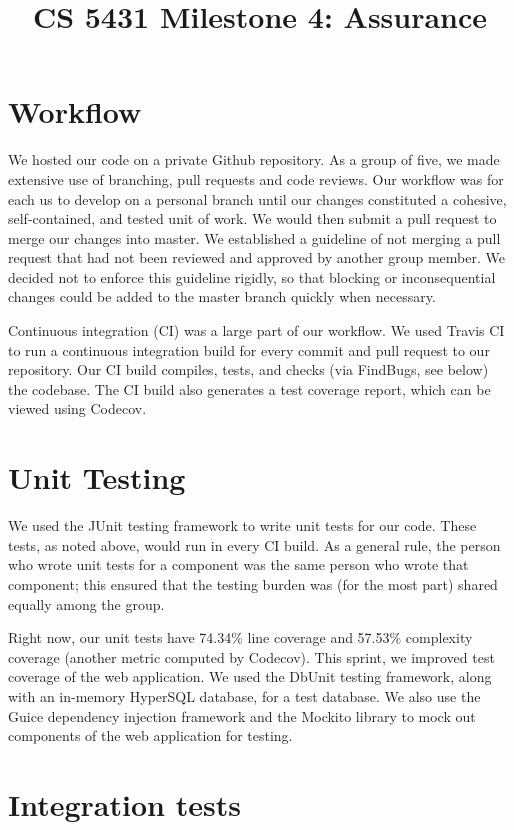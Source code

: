 \documentclass[a4paper,12pt]{article}
\title{CS 5431 Milestone 4: Assurance}
\author{
\iam{James Cassell}{jcc384}
\and
\iam{Evan King}{esk79}
\and
\iam{Ethan Koenig}{etk39}
\and
\iam{Eric Perdew}{ecp84}
\and
\iam{Will Ronchetti}{wrr33}
}
\begin{document}
\maketitle

\section{Workflow}
We hosted our code on a private Github repository. As a group of five, we made extensive use of branching, pull requests and code reviews. Our workflow was for each us to develop on a personal branch until our changes constituted a cohesive, self-contained, and tested unit of work. We would then submit a pull request to merge our changes into master. We established a guideline of not merging a pull request that had not been reviewed and approved by another group member. We decided not to enforce this guideline rigidly, so that blocking or inconsequential changes could be added to the master branch quickly when necessary.

Continuous integration (CI) was a large part of our workflow. We used Travis CI to run a continuous integration build for every commit and pull request to our repository. Our CI build compiles, tests, and checks (via FindBugs, see below) the codebase. The CI build also generates a test coverage report, which can be viewed using Codecov.

\section{Unit Testing}

We used the JUnit testing framework to write unit tests for our code. These tests, as noted above, would run in every CI build. As a general rule, the person who wrote unit tests for a component was the same person who wrote that component; this ensured that the testing burden was (for the most part) shared equally among the group.

Right now, our unit tests have 74.34\% line coverage and 57.53\% complexity coverage (another metric computed by Codecov). This sprint, we improved test coverage of the web application. We used the DbUnit testing framework, along with an in-memory HyperSQL database, for a test database. We also use the Guice dependency injection framework and the Mockito library to mock out components of the web application for testing.

\section{Integration tests}
\end{document}
